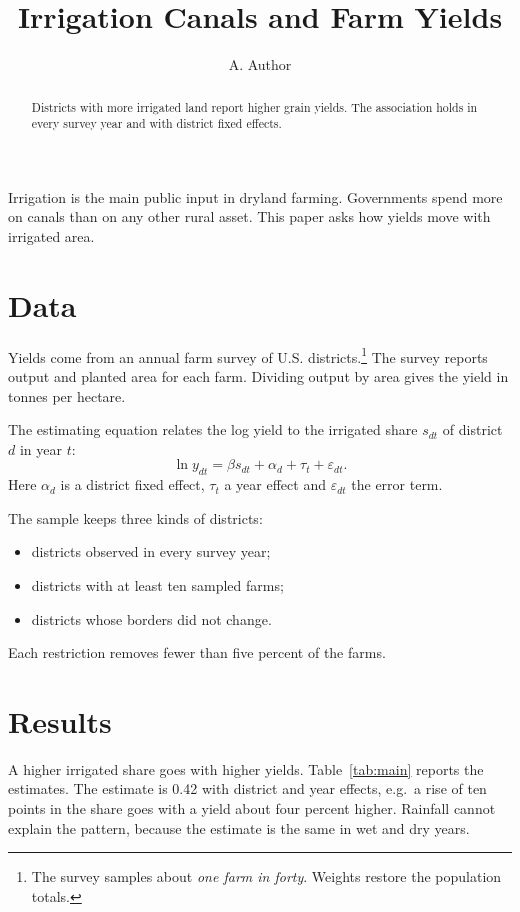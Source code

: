 \documentclass[12pt]{article}
\title{Irrigation Canals and Farm Yields}
\author{A. Author}
\begin{document}
\maketitle

\begin{abstract}
Districts with more irrigated land report higher grain yields. The association holds in every
survey year and with district fixed effects.
\end{abstract}

Irrigation is the main public input in dryland farming. Governments spend more on canals than on
any other rural asset. This paper asks how yields move with irrigated area.

\section{Data}
\label{sec:data}

Yields come from an annual farm survey of U.S. districts.\footnote{The survey samples about
\textit{one farm in {forty}}. Weights restore the population totals.} The survey reports output
and planted area for each farm. Dividing output by area gives the yield in tonnes per hectare.

The estimating equation relates the log yield to the irrigated share $s_{dt}$ of district $d$ in
year $t$:
\begin{equation}
\ln y_{dt} = \beta s_{dt} + \alpha_d + \tau_t + \varepsilon_{dt}.
\label{eq:main}
\end{equation}
Here $\alpha_d$ is a district fixed effect, $\tau_t$ a year effect and $\varepsilon_{dt}$ the
error term.

The sample keeps three kinds of districts:
\begin{itemize}
\item districts observed in every survey year;
\item districts with at least ten sampled farms;
\item districts whose borders did not change.
\end{itemize}
Each restriction removes fewer than five percent of the farms.

\section{Results}

A higher irrigated share goes with higher yields. Table~\ref{tab:main} reports the estimates. The
estimate is 0.42 with district and year effects, e.g.\ a rise of ten points in the share goes with
a yield about four percent higher. Rainfall cannot explain the pattern, because the estimate is the
same in wet and dry years.
\end{document}
